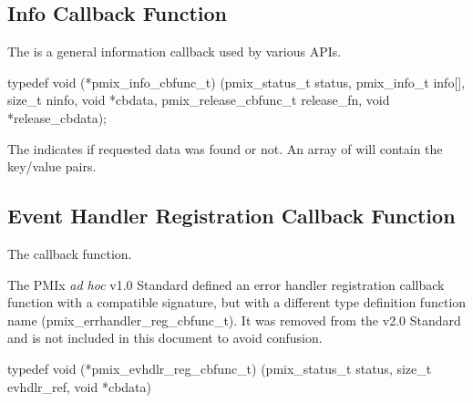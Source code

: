 \subsection{Info Callback Function}

\summary

The  is a general information callback used by various APIs.

\cspecificstart
\begin{codepar}
typedef void (*pmix_info_cbfunc_t)
    (pmix_status_t status,
     pmix_info_t info[], size_t ninfo,
     void *cbdata,
     pmix_release_cbfunc_t release_fn,
     void *release_cbdata);
\end{codepar}
\cspecificend

\begin{arglist}
\end{arglist}


\descr

The  indicates if requested data was found or not.
An array of  will contain the key/value pairs.


\subsection{Event Handler Registration Callback Function}

The  callback function.

\adviceuserstart
The \ac{PMIx} \textit{ad hoc} v1.0 Standard defined an error handler registration callback function with a compatible signature, but with a different type definition function name (pmix_errhandler_reg_cbfunc_t). It was removed from the v2.0 Standard and is not included in this document to avoid confusion.
\adviceuserend

\cspecificstart
\begin{codepar}
typedef void (*pmix_evhdlr_reg_cbfunc_t)
    (pmix_status_t status,
     size_t evhdlr_ref,
     void *cbdata)
\end{codepar}
\cspecificend

